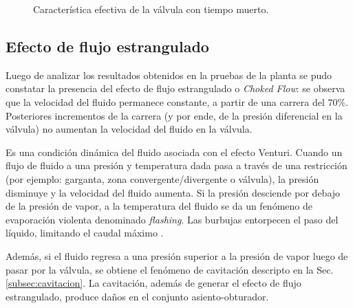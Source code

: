 \begin{figure}[ht]
  \centering
\caption{Característica efectiva de la válvula con tiempo muerto.}
\label{fig:valvulaCtiempoMuerto}
\end{figure}

\subsection{Efecto de flujo estrangulado}
\label{subsec:chokedflow}

Luego de analizar los resultados obtenidos en la pruebas de la planta se pudo
constatar la presencia del efecto de flujo estrangulado o \emph{Choked
Flow}: se observa que la velocidad del fluido permanece constante, a partir de
una carrera del $70\%$.
Posteriores incrementos de la carrera (y por ende, de la presión diferencial
en la válvula) no aumentan la velocidad del fluido en la válvula.

Es una condición dinámica del fluido asociada con el efecto Venturi.
Cuando un flujo de fluido a una presión y temperatura dada pasa a través de una
restricción (por ejemplo: garganta, zona convergente/divergente o válvula),
la presión disminuye y la velocidad del fluido aumenta.
Si la presión desciende por debajo de la presión de vapor, a la
temperatura del fluido se da un fenómeno de evaporación violenta denominado
\emph{flashing}.
Las burbujas entorpecen el paso del líquido, limitando el caudal máximo
\cite{bib:ApuntesPuglesiValvulas}\cite{bib:controlValveHandbook}.

Además, si el fluido regresa a una presión superior a la presión de vapor luego
de pasar por la válvula, se obtiene el fenómeno de cavitación descripto en la
Sec. \ref{subsec:cavitacion}.
La cavitación, además de generar el efecto de flujo estrangulado, produce daños
en el conjunto asiento-obturador.

